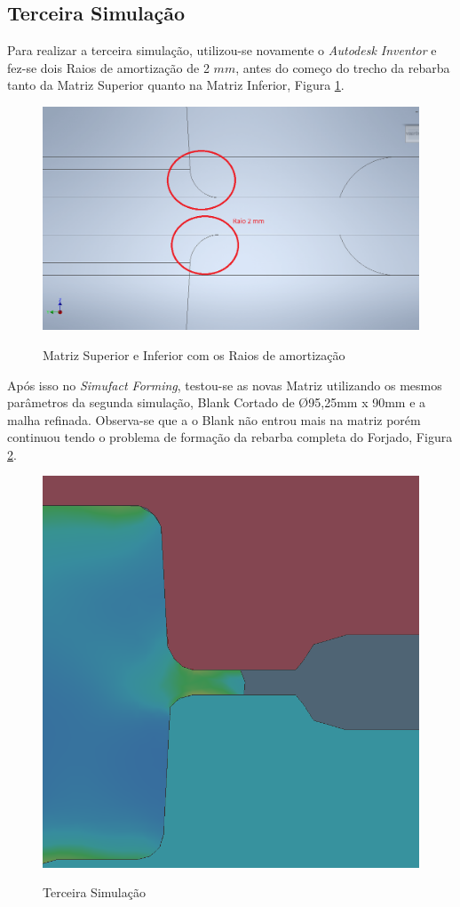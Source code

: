 \documentclass[deposito, acronym, symbols]{fei}
\begin{document}
\subsection{Terceira Simulação}

Para realizar a terceira simulação, utilizou-se novamente o \textit{Autodesk Inventor} e fez-se dois Raios de amortização de 2 $mm$, antes do começo do trecho da rebarba tanto da Matriz Superior quanto na Matriz Inferior, Figura \ref{fig:raios}.

\begin{figure}[!htp]
    \centering
    \caption{Matriz Superior e Inferior com os Raios de amortização}
    \includegraphics[width=0.7\linewidth]{Imagens/Raio de amortização indicado.png}
    \label{fig:raios}
\end{figure}

Após isso no \textit{Simufact Forming}, testou-se as novas Matriz utilizando os mesmos parâmetros da segunda simulação, Blank Cortado de Ø95,25mm x 90mm e a malha refinada. Observa-se que a o Blank não entrou mais na matriz porém continuou tendo o problema de formação da rebarba completa do Forjado, Figura \ref{fig:3simu}.

\begin{figure}[!htp]
    \centering
    \caption{Terceira Simulação}
    \includegraphics[width=0.5\linewidth]{Imagens/Simufact - 3º Simulação Matriz com raios.png}
    \label{fig:3simu}
\end{figure}
\end{document}
